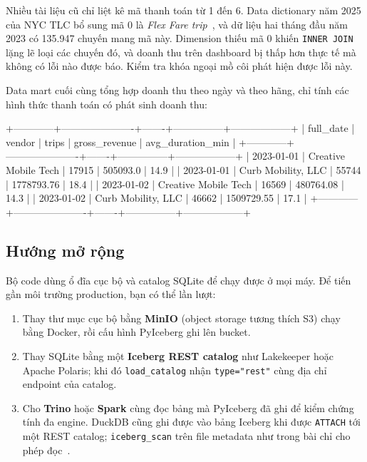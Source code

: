 \documentclass[12pt]{article}
\begin{document}
\begin{notebox}
Nhiều tài liệu cũ chỉ liệt kê mã thanh toán từ 1 đến 6. Data dictionary năm 2025 của NYC TLC bổ sung mã 0 là \textit{Flex Fare trip}~\cite{tlc2025dictionary}, và dữ liệu hai tháng đầu năm 2023 có 135.947 chuyến mang mã này. Dimension thiếu mã 0 khiến \texttt{INNER JOIN} lặng lẽ loại các chuyến đó, và doanh thu trên dashboard bị thấp hơn thực tế mà không có lỗi nào được báo. Kiểm tra khóa ngoại mồ côi phát hiện được lỗi này.
\end{notebox}

Data mart cuối cùng tổng hợp doanh thu theo ngày và theo hãng, chỉ tính các hình thức thanh toán có phát sinh doanh thu:

\begin{aivnCodeOutput}
\begin{python}
+------------+----------------------+-------+---------------+------------------+
| full_date  |        vendor        | trips | gross_revenue | avg_duration_min |
+------------+----------------------+-------+---------------+------------------+
| 2023-01-01 | Creative Mobile Tech | 17915 |      505093.0 |             14.9 |
| 2023-01-01 | Curb Mobility, LLC   | 55744 |    1778793.76 |             18.4 |
| 2023-01-02 | Creative Mobile Tech | 16569 |     480764.08 |             14.3 |
| 2023-01-02 | Curb Mobility, LLC   | 46662 |    1509729.55 |             17.1 |
+------------+----------------------+-------+---------------+------------------+
\end{python}
\end{aivnCodeOutput}

\subsection{Hướng mở rộng}

Bộ code dùng ổ đĩa cục bộ và catalog SQLite để chạy được ở mọi máy. Để tiến gần môi trường production, bạn có thể lần lượt:

\begin{enumerate}
    \item Thay thư mục cục bộ bằng \textbf{MinIO} (object storage tương thích S3) chạy bằng Docker, rồi cấu hình PyIceberg ghi lên bucket.
    \item Thay SQLite bằng một \textbf{Iceberg REST catalog} như Lakekeeper hoặc Apache Polaris; khi đó \texttt{load\_catalog} nhận \texttt{type="rest"} cùng địa chỉ endpoint của catalog.
    \item Cho \textbf{Trino} hoặc \textbf{Spark} cùng đọc bảng mà PyIceberg đã ghi để kiểm chứng tính đa engine. DuckDB cũng ghi được vào bảng Iceberg khi được \texttt{ATTACH} tới một REST catalog; \texttt{iceberg\_scan} trên file metadata như trong bài chỉ cho phép đọc~\cite{duckdb2026iceberg}.
\end{enumerate}
\end{document}
